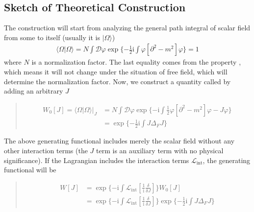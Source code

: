 \documentclass[letterpaper,10pt,english]{sphinxmanual}
\begin{document}
\subsection{Sketch of Theoretical Construction}
\label{\detokenize{qft_sketch:sketch-of-theoretical-construction}}
The construction will start from analyzing the general path integral of scalar field from some  to itself (usually it is  \(|\Omega\rangle\))
\begin{equation*}
\begin{split}\langle \Omega|\Omega\rangle = N\int\mathcal{D}\varphi\exp\{-\frac{1}{2}\mathrm{i}\int\varphi[\partial^2-m^2]\varphi\} = 1\end{split}
\end{equation*}
where \(N\) is a normalization factor. The last equality comes from the property , which means it will not change under the situation of free field, which will determine the normalization factor. Now, we construct a quantity called  by adding an arbitrary  \(J\)
\begin{quote}

\begin{equation*}
\begin{split}W_0[J] = \langle\Omega|\Omega\rangle |_J &= N\int\mathcal{D}\varphi\exp\{-\mathrm{i}\int\frac{1}{2}\varphi[\partial^2-m^2]\varphi - J\varphi\}\\
&= \exp\{-\frac{1}{2}\mathrm{i}\int J\Delta_FJ\}\end{split}
\end{equation*}\end{quote}

The above generating functional includes merely the scalar field without any other  interaction terms (the \(J\) term is an auxiliary term with no physical significance). If the Lagrangian includes the interaction terms \(\mathcal{L}_{\text{int}}\), the generating functional will be
\begin{quote}

\begin{equation*}
\begin{split}W[J] &= \exp\{-\mathrm{i}\int\mathcal{L}_{\text{int}}\!\!\left[\frac{1}{\mathrm{i}}\!\frac{\delta}{\delta J}\right]\} W_0[J] \\
&= \exp\{-\mathrm{i}\int\mathcal{L}_{\text{int}}\!\!\left[\frac{1}{\mathrm{i}}\!\frac{\delta}{\delta J}\right]\}\exp\{-\frac{1}{2}\mathrm{i}\int J\Delta_FJ\}\end{split}
\end{equation*}\end{quote}
\end{document}
